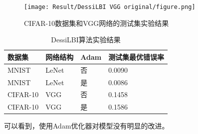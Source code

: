 \documentclass{article}
\begin{document}
\begin{figure}[p]
\centering
\texttt{[image: Result/DessiLBI VGG original/figure.png]}
\caption{CIFAR-10数据集和VGG网络的测试集实验结果}
\label{fig:DessiLBIVGG}
\end{figure}

\begin{table}[p]
\centering
\begin{tabular}{|l|l|l|l|} 
\hline
数据集 & 网络结构 & Adam & 测试集最优错误率 \\
\hline
MNIST & LeNet & 否 & 0.0090 \\
MNIST & LeNet & 是 & 0.0086 \\
CIFAR-10 & VGG & 否 & 0.1458 \\
CIFAR-10 & VGG & 是 & 0.1586 \\
\hline
\end{tabular}
\caption{DessiLBI算法实验结果}
\label{table:DessiLBI}
\end{table}

可以看到，使用Adam优化器对模型没有明显的改进。
\end{document}
